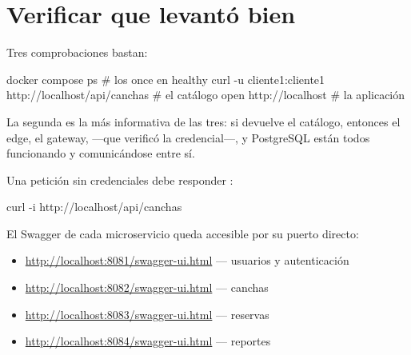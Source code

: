 
\section{Verificar que levantó bien}

Tres comprobaciones bastan:

\begin{comando}
docker compose ps                                       # los once en healthy
curl -u cliente1:cliente1 http://localhost/api/canchas   # el catálogo
open http://localhost                                    # la aplicación
\end{comando}

La segunda es la más informativa de las tres: si devuelve el catálogo, entonces
el edge, el gateway,  —que verificó la credencial—,
 y PostgreSQL están todos funcionando y comunicándose entre
sí.

Una petición sin credenciales debe responder :

\begin{comando}
curl -i http://localhost/api/canchas
\end{comando}

El Swagger de cada microservicio queda accesible por su puerto directo:

\begin{itemize}
  \item \url{http://localhost:8081/swagger-ui.html} — usuarios y autenticación
  \item \url{http://localhost:8082/swagger-ui.html} — canchas
  \item \url{http://localhost:8083/swagger-ui.html} — reservas
  \item \url{http://localhost:8084/swagger-ui.html} — reportes
\end{itemize}
